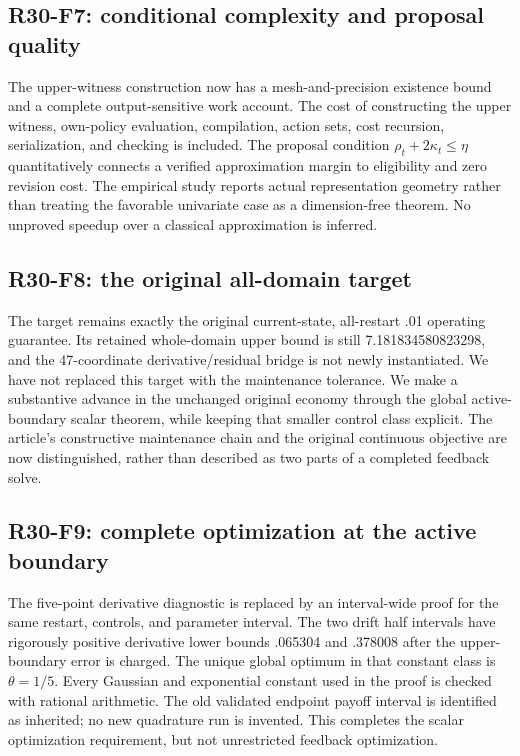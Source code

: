 \subsection{R30-F7: conditional complexity and proposal quality}
The upper-witness construction now has a mesh-and-precision existence bound and a complete output-sensitive work account. The cost of constructing the upper witness, own-policy evaluation, compilation, action sets, cost recursion, serialization, and checking is included. The proposal condition $\rho_t+2\kappa_t\le\eta$ quantitatively connects a verified approximation margin to eligibility and zero revision cost. The empirical study reports actual representation geometry rather than treating the favorable univariate case as a dimension-free theorem. No unproved speedup over a classical approximation is inferred.

\subsection{R30-F8: the original all-domain target}
The target remains exactly the original current-state, all-restart .01 operating guarantee. Its retained whole-domain upper bound is still 7.181834580823298, and the 47-coordinate derivative/residual bridge is not newly instantiated. We have not replaced this target with the maintenance tolerance. We make a substantive advance in the unchanged original economy through the global active-boundary scalar theorem, while keeping that smaller control class explicit. The article's constructive maintenance chain and the original continuous objective are now distinguished, rather than described as two parts of a completed feedback solve.

\subsection{R30-F9: complete optimization at the active boundary}
The five-point derivative diagnostic is replaced by an interval-wide proof for the same restart, controls, and parameter interval. The two drift half intervals have rigorously positive derivative lower bounds .065304 and .378008 after the upper-boundary error is charged. The unique global optimum in that constant class is $\theta=1/5$. Every Gaussian and exponential constant used in the proof is checked with rational arithmetic. The old validated endpoint payoff interval is identified as inherited; no new quadrature run is invented. This completes the scalar optimization requirement, but not unrestricted feedback optimization.


